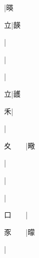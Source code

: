 \begin{multicols}{2}
{{\cjk{}{\cnsym{}　}{\cnsym{}　}{\cnsym{}　}}|{\cjk{}暎}\par
{\cjk{}{\cnsym{}　}{\cnsym{}　}立}|{\cjk{}韺}\par
{\cjk{}{\cnsym{}　}{\cnsym{}　}{\cnsym{}　}}|{}\par
{\cjk{}{\cnsym{}　}{\cnsym{}　}{\cnsym{}　}}|{}\par
{\cjk{}{\cnsym{}　}{\cnsym{}　}{\cnsym{}　}}|{}\par
{\cjk{}{\cnsym{}　}{\cnsym{}　}立}|{\cjk{}頀}\par
{\cjk{}{\cnsym{}　}{\cnsym{}　}禾}|{}\par
{\cjk{}{\cnsym{}　}{\cnsym{}　}{\cnsym{}　}}|{}\par
{\cjk{}夊{\cnsym{}　}{\cnsym{}　}}|{\cjk{}曔}\par
{\cjk{}{\cnsym{}　}{\cnsym{}　}{\cnsym{}　}}|{}\par
{\cjk{}{\cnsym{}　}{\cnsym{}　}{\cnsym{}　}}|{}\par
{\cjk{}{\cnsym{}　}{\cnsym{}　}{\cnsym{}　}}|{}\par
{\cjk{}口{\cnsym{}　}{\cnsym{}　}}|{}\par
{\cjk{}豕{\cnsym{}　}{\cnsym{}　}}|{\cjk{}曚}\par
{\cjk{}{\cnsym{}　}{\cnsym{}　}{\cnsym{}　}}|{}\par
}
\end{multicols}
